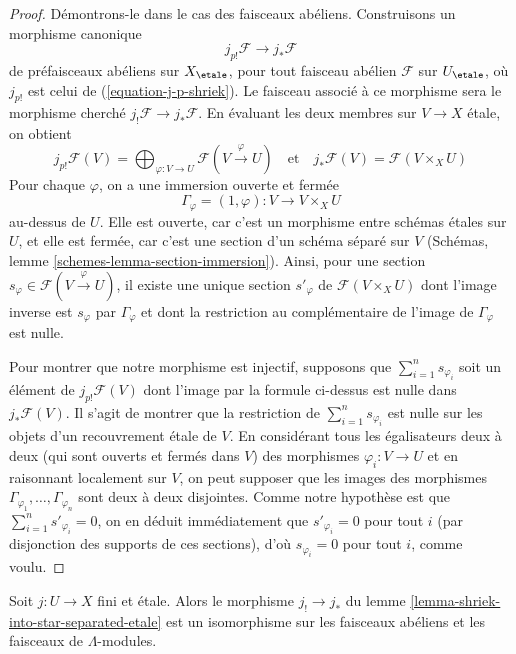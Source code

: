 \begin{proof}
Démontrons-le dans le cas des faisceaux abéliens. Construisons un morphisme canonique
$$
j_{p!}\mathcal{F} \to j_*\mathcal{F}
$$
de préfaisceaux abéliens sur $X_\etale$, pour tout faisceau abélien
$\mathcal{F}$ sur $U_\etale$, où $j_{p!}$ est celui de
(\ref{equation-j-p-shriek}). Le faisceau associé à ce morphisme sera
le morphisme cherché $j_!\mathcal{F} \to j_*\mathcal{F}$.
En évaluant les deux membres sur $V \to X$ étale, on obtient
$$
j_{p!}\mathcal{F}(V) =
\bigoplus\nolimits_{\varphi : V \to U} \mathcal{F}(V \xrightarrow{\varphi} U)
\quad\text{et}\quad
j_*\mathcal{F}(V) = \mathcal{F}(V \times_X U)
$$
Pour chaque $\varphi$, on a une immersion ouverte et fermée
$$
\Gamma_\varphi = (1, \varphi) : V \longrightarrow V \times_X U
$$
au-dessus de $U$. Elle est ouverte, car c'est un morphisme entre schémas étales
sur $U$, et elle est fermée, car c'est une section d'un schéma séparé
sur $V$ (Schémas, lemme \ref{schemes-lemma-section-immersion}).
Ainsi, pour une section $s_\varphi \in \mathcal{F}(V \xrightarrow{\varphi} U)$,
il existe une unique section $s'_\varphi$ de $\mathcal{F}(V \times_X U)$
dont l'image inverse est $s_\varphi$ par $\Gamma_\varphi$
et dont la restriction au complémentaire de l'image de $\Gamma_\varphi$ est nulle.

\medskip\noindent
Pour montrer que notre morphisme est injectif, supposons que
$\sum_{i = 1}^n s_{\varphi_i}$ soit un élément de
$j_{p!}\mathcal{F}(V)$ dont l'image par la formule ci-dessus est nulle
dans $j_*\mathcal{F}(V)$. Il s'agit de montrer que la restriction de
$\sum_{i = 1}^n s_{\varphi_i}$ est nulle
sur les objets d'un recouvrement étale de $V$.
En considérant tous les égalisateurs deux à deux
(qui sont ouverts et fermés dans $V$) des morphismes
$\varphi_i : V \to U$ et en raisonnant localement sur $V$, on
peut supposer que les images des morphismes
$\Gamma_{\varphi_1}, \ldots, \Gamma_{\varphi_n}$
sont deux à deux disjointes. Comme notre hypothèse est que
$\sum_{i = 1}^n s'_{\varphi_i} = 0$,
on en déduit immédiatement que $s'_{\varphi_i} = 0$
pour tout $i$ (par disjonction des supports de ces
sections), d'où $s_{\varphi_i} = 0$ pour tout $i$, comme voulu.
\end{proof}

\begin{lemma}
\label{lemma-shriek-equals-star-finite-etale}
Soit $j : U \to X$ fini et étale. Alors le morphisme
$j_! \to j_*$ du lemme \ref{lemma-shriek-into-star-separated-etale}
est un isomorphisme
sur les faisceaux abéliens et les faisceaux de $\Lambda$-modules.
\end{lemma}


